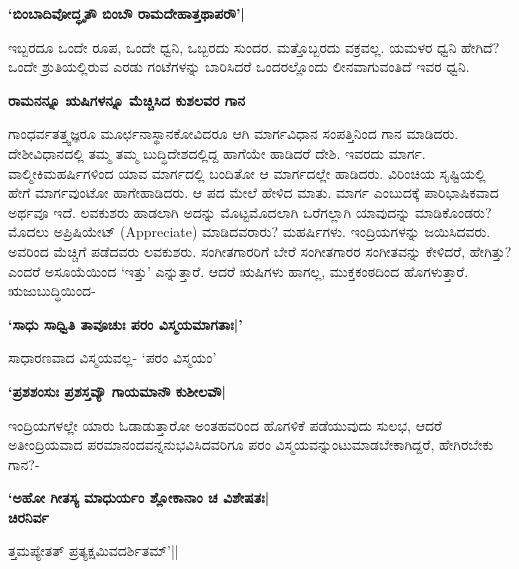 \begin{center} 

{\bf `ಬಿಂಬಾದಿವೋದ್ಧೃತೌ ಬಿಂಬೌ ರಾಮದೇಹಾತ್ತಥಾಪರೌ'|} 

\end{center} 


ಇಬ್ಬರದೂ ಒಂದೇ ರೂಪ, ಒಂದೇ ಧ್ವನಿ, ಒಬ್ಬರದು ಸುಂದರ. ಮತ್ತೊಬ್ಬರದು ವಕ್ರವಲ್ಲ. ಯಮಳರ ಧ್ವನಿ ಹೇಗಿದೆ? ಒಂದೇ ಶ್ರುತಿಯಲ್ಲಿರುವ ಎರಡು ಗಂಟೆಗಳನ್ನು ಬಾರಿಸಿದರೆ ಒಂದರಲ್ಲೊಂದು ಲೀನವಾಗುವಂತಿದೆ ಇವರ ಧ್ವನಿ. 


{\bf ರಾಮನನ್ನೂ ಋಷಿಗಳನ್ನೂ ಮೆಚ್ಚಿಸಿದ ಕುಶಲವರ ಗಾನ} 


ಗಾಂಧರ್ವತತ್ತ್ವಜ್ಞರೂ ಮೂರ್ಛನಾಸ್ಥಾನಕೋವಿದರೂ ಆಗಿ ಮಾರ್ಗವಿಧಾನ ಸಂಪತ್ತಿನಿಂದ ಗಾನ ಮಾಡಿದರು. ದೇಶೀವಿಧಾನದಲ್ಲಿ ತಮ್ಮ ತಮ್ಮ ಬುದ್ಧಿದೇಶದಲ್ಲಿದ್ದ ಹಾಗೆಯೇ ಹಾಡಿದರೆ ದೇಶಿ. ಇವರದು ಮಾರ್ಗ. ವಾಲ್ಮೀಕಿಮಹರ್ಷಿಗಳಿಂದ ಯಾವ ಮಾರ್ಗದಲ್ಲಿ ಬಂದಿತೋ ಆ ಮಾರ್ಗದಲ್ಲೇ ಹಾಡಿದರು. ವಿರಿಂಚಿಯ ಸೃಷ್ಟಿಯಲ್ಲಿ ಹೇಗೆ ಮಾರ್ಗವುಂಟೋ ಹಾಗೇಹಾಡಿದರು. ಆ ಪದ ಮೇಲೆ ಹೇಳಿದ ಮಾತು. ಮಾರ್ಗ ಎಂಬುದಕ್ಕೆ ಪಾರಿಭಾಷಿಕವಾದ ಅರ್ಥವೂ ಇದೆ. ಲವಕುಶರು ಹಾಡಲಾಗಿ ಅದನ್ನು ಮೊಟ್ಟಮೊದಲಾಗಿ ಒರೆಗಲ್ಲಾಗಿ ಯಾವುದನ್ನು ಮಾಡಿಕೊಂಡರು? ಮೊದಲು ಅಪ್ರಿಷಿಯೇಟ್‍ {\rm(Appreciate)} ಮಾಡಿದವರಾರು? ಮಹರ್ಷಿಗಳು. ಇಂದ್ರಿಯಗಳನ್ನು ಜಯಿಸಿದವರು. ಅವರಿಂದ ಮೆಚ್ಚಿಗೆ ಪಡೆದವರು ಲವಕುಶರು. ಸಂಗೀತಗಾರರಿಗೆ ಬೇರೆ ಸಂಗೀತಗಾರರ ಸಂಗೀತವನ್ನು ಕೇಳಿದರೆ, ಹೇಗಿತ್ತು? ಎಂದರೆ ಅಸೂಯೆಯಿಂದ `ಇತ್ತು' ಎನ್ನುತ್ತಾರೆ. ಆದರೆ ಋಷಿಗಳು ಹಾಗಲ್ಲ, ಮುಕ್ತಕಂಠದಿಂದ ಹೊಗಳುತ್ತಾರೆ. ಋಜುಬುದ್ಧಿಯಿಂದ- 


\begin{center} 

{\bf `ಸಾಧು ಸಾಧ್ವಿತಿ ತಾವೂಚುಃ ಪರಂ ವಿಸ್ಮಯಮಾಗತಾಃ|'} 

\end{center} 


ಸಾಧಾರಣವಾದ ವಿಸ್ಮಯವಲ್ಲ- `ಪರಂ ವಿಸ್ಮಯಂ' 


\begin{center} 

{\bf `ಪ್ರಶಶಂಸುಃ ಪ್ರಶಸ್ತವ್ಯೌ ಗಾಯಮಾನೌ ಕುಶೀಲವೌ|} 

\end{center} 


ಇಂದ್ರಿಯಗಳಲ್ಲೇ ಯಾರು ಓಡಾಡುತ್ತಾರೋ ಅಂತಹವರಿಂದ ಹೊಗಳಿಕೆ ಪಡೆಯುವುದು ಸುಲಭ, ಆದರೆ ಅತೀಂದ್ರಿಯವಾದ ಪರಮಾನಂದವನ್ನನುಭವಿಸಿದವರಿಗೂ ಪರಂ ವಿಸ್ಮಯವನ್ನುಂಟುಮಾಡಬೇಕಾಗಿದ್ದರೆ, ಹೇಗಿರಬೇಕು ಗಾನ?- 


\begin{center} 

{\bf `ಅಹೋ ಗೀತಸ್ಯ ಮಾಧುರ್ಯಂ ಶ್ಲೋಕಾನಾಂ ಚ ವಿಶೇಷತಃ|\\ 

ಚಿರನಿರ್ವ

ತ್ತಮಪ್ಯೇತತ್‍ ಪ್ರತ್ಯಕ್ಷಮಿವದರ್ಶಿತಮ್‍'||} 

\end{center} 


